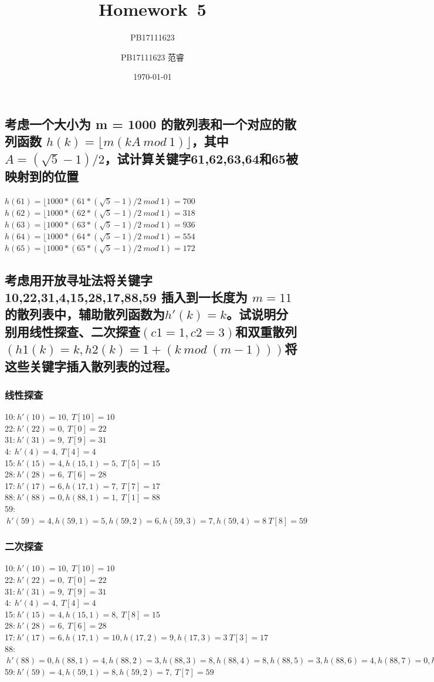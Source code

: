\documentclass[UTF8]{ctexart}
\title{Homework\ 5}
\author{PB17111623}
\author{PB17111623 范睿}
\date{\today}
\begin{document}
\maketitle
\section{}
\subsection{考虑一个大小为 m = 1000 的散列表和一个对应的散列函数 $h(k) = \lfloor m(kA\ mod\ 1)\rfloor$，其中$A = (\sqrt{5} -  1)/2$，试计算关键字61,62,63,64和65被映射到的位置}
$h(61)=\lfloor 1000*(61*(\sqrt{5} -  1)/2\ mod\ 1)=700$\\
$h(62)=\lfloor 1000*(62*(\sqrt{5} -  1)/2\ mod\ 1)=318$\\
$h(63)=\lfloor 1000*(63*(\sqrt{5} -  1)/2\ mod\ 1)=936$\\
$h(64)=\lfloor 1000*(64*(\sqrt{5} -  1)/2\ mod\ 1)=554$\\
$h(65)=\lfloor 1000*(65*(\sqrt{5} -  1)/2\ mod\ 1)=172$

\subsection{考虑用开放寻址法将关键字 10,22,31,4,15,28,17,88,59 插入到一长度为 $m = 11$ 的散列表中，辅助散列函数为$h'(k) = k$。试说明分别用线性探查、二次探查$(c1 = 1, c2 = 3)$和双重散列$(h1(k) = k,h2(k) = 1+(k\ mod\ (m - 1)))$将这些关键字插入散列表的过程。}
\subsubsection{线性探查}
10:$\ h'(10)=10,\ T[10]=10$\\
22:$\ h'(22)=0,\ T[0]=22$\\
31:$\ h'(31)=9,\ T[9]=31$\\
4:$\ \ h'(4)=4,\ T[4]=4$\\
15:$\ h'(15)=4,h(15,1)=5,\ T[5]=15$\\
28:$\ h'(28)=6,\ T[6]=28$\\
17:$\ h'(17)=6,h(17,1)=7,\ T[7]=17$\\
88:$\ h'(88)=0,h(88,1)=1,\ T[1]=88$\\
59:$\ h'(59)=4, h(59,1)=5, h(59,2)=6, h(59,3)=7, h(59,4)=8\ T[8]=59$
\subsubsection{二次探查}
10:$\ h'(10)=10,\ T[10]=10$\\
22:$\ h'(22)=0,\ T[0]=22$\\
31:$\ h'(31)=9,\ T[9]=31$\\
4:$\ \ h'(4)=4,\ T[4]=4$\\
15:$\ h'(15)=4,h(15,1)=8,\ T[8]=15$\\
28:$\ h'(28)=6,\ T[6]=28$\\
17:$\ h'(17)=6,h(17,1)=10,h(17,2)=9, h(17,3)=3\ T[3]=17$\\
88:$\ h'(88)=0,h(88,1)=4,h(88,2)=3,h(88,3)=8,h(88,4)=8,h(88,5)=3,h(88,6)=4,h(88,7)=0,h(88,8)=2\ T[2]=88$\\
59:$\ h'(59)=4, h(59,1)=8,h(59,2)=7,\ T[7]=59$
\end{document}
